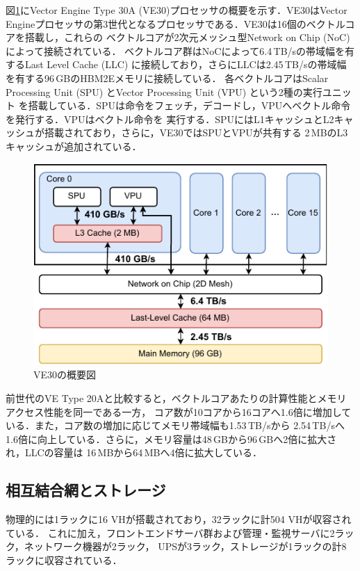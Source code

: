 ﻿\documentclass[submit,techrep,noauthor]{ipsj}
\begin{document}
図\ref{fig:ve30}にVector Engine Type 30A (VE30)プロセッサの概要を示す．VE30はVector
Engineプロセッサの第3世代となるプロセッサである．VE30は16個のベクトルコアを搭載し，これらの
ベクトルコアが2次元メッシュ型Network on Chip (NoC)によって接続されている．
ベクトルコア群はNoCによって6.4\,TB/sの帯域幅を有するLast Level Cache 
(LLC) に接続しており，さらにLLCは2.45\,TB/sの帯域幅を有する96\,GBのHBM2Eメモリに接続している．
各ベクトルコアはScalar Processing Unit (SPU) とVector Processing Unit (VPU) という2種の実行ユニット
を搭載している．SPUは命令をフェッチ，デコードし，VPUへベクトル命令を発行する．VPUはベクトル命令を
実行する．SPUにはL1キャッシュとL2キャッシュが搭載されており，さらに，VE30ではSPUとVPUが共有する
2\,MBのL3キャッシュが追加されている．

\begin{figure}[tb]
  \centering
  \includegraphics{figs/ve30_memory_hierarchy.pdf}
  \caption{VE30の概要図~\cite{Takahashi2023}}\label{fig:ve30}
\end{figure}

前世代のVE Type 20Aと比較すると，ベクトルコアあたりの計算性能とメモリアクセス性能を同一である一方，
コア数が10コアから16コアへ1.6倍に増加している．また，コア数の増加に応じてメモリ帯域幅も1.53\,TB/sから
2.54\,TB/sへ1.6倍に向上している．さらに，メモリ容量は48\,GBから96\,GBへ2倍に拡大され，LLCの容量は
16\,MBから64\,MBへ4倍に拡大している．

\subsection{相互結合網とストレージ}

物理的には1ラックに16 VHが搭載されており，32ラックに計504 VHが収容されている．
これに加え，フロントエンドサーバ群および管理・監視サーバに2ラック，ネットワーク機器が2ラック，
UPSが3ラック，ストレージが1ラックの計8ラックに収容されている．
\end{document}
